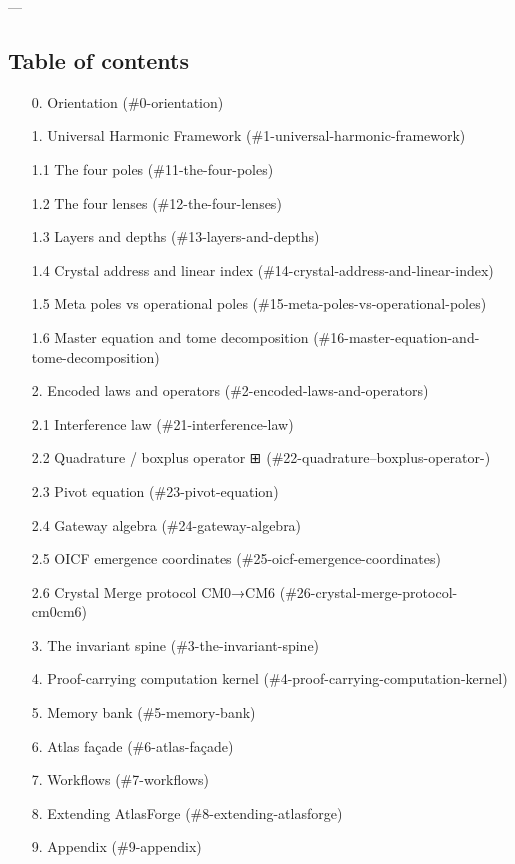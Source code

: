 \documentclass[11pt]{article}
\begin{document}
---

\subsection{Table of contents}

\begin{itemize}
\item [0. Orientation](\#0-orientation)
\item [1. Universal Harmonic Framework](\#1-universal-harmonic-framework)
\item [1.1 The four poles](\#11-the-four-poles)
\item [1.2 The four lenses](\#12-the-four-lenses)
\item [1.3 Layers and depths](\#13-layers-and-depths)
\item [1.4 Crystal address and linear index](\#14-crystal-address-and-linear-index)
\item [1.5 Meta poles vs operational poles](\#15-meta-poles-vs-operational-poles)
\item [1.6 Master equation and tome decomposition](\#16-master-equation-and-tome-decomposition)
\item [2. Encoded laws and operators](\#2-encoded-laws-and-operators)
\item [2.1 Interference law](\#21-interference-law)
\item [2.2 Quadrature / boxplus operator ⊞](\#22-quadrature--boxplus-operator-)
\item [2.3 Pivot equation](\#23-pivot-equation)
\item [2.4 Gateway algebra](\#24-gateway-algebra)
\item [2.5 OICF emergence coordinates](\#25-oicf-emergence-coordinates)
\item [2.6 Crystal Merge protocol CM0→CM6](\#26-crystal-merge-protocol-cm0cm6)
\item [3. The invariant spine](\#3-the-invariant-spine)
\item [4. Proof-carrying computation kernel](\#4-proof-carrying-computation-kernel)
\item [5. Memory bank](\#5-memory-bank)
\item [6. Atlas façade](\#6-atlas-façade)
\item [7. Workflows](\#7-workflows)
\item [8. Extending AtlasForge](\#8-extending-atlasforge)
\item [9. Appendix](\#9-appendix)
\end{itemize}
\end{document}
